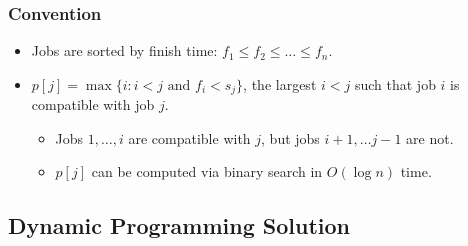 \subsubsection{Convention}

\begin{itemize}
    \item Jobs are sorted by finish time: $f_1 \leq f_2 \leq \ldots \leq f_n$.
    \item $p[j] = \max\{i: i < j \text{ and } f_i < s_j\}$, the largest $i < j$ such that job $i$ is compatible with job $j$.
    \begin{itemize}
        \item Jobs $1, \dots, i$ are compatible with $j$, but jobs $i + 1, \dots j - 1$ are not.
        \item $p[j]$ can be computed via binary search in $O(\log n)$ time.
    \end{itemize}
\end{itemize}

\subsection{Dynamic Programming Solution}

